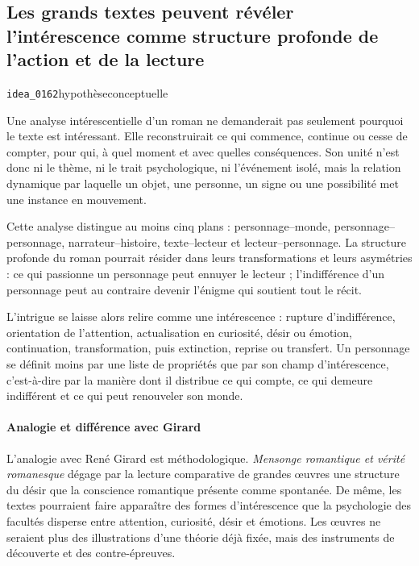\documentclass[10pt,a4paper]{article}
\begin{document}
\subsection{Les grands textes peuvent révéler l'intérescence comme structure profonde de l'action et de la lecture}
{\small\color{metadata} \texttt{idea\_0162}\quad\textbullet\quad hypothèse\quad\textbullet\quad conceptuelle\par}

Une analyse intérescentielle d'un roman ne demanderait pas seulement pourquoi le texte est intéressant. Elle reconstruirait ce qui commence, continue ou cesse de compter, pour qui, à quel moment et avec quelles conséquences. Son unité n'est donc ni le thème, ni le trait psychologique, ni l'événement isolé, mais la relation dynamique par laquelle un objet, une personne, un signe ou une possibilité met une instance en mouvement.

Cette analyse distingue au moins cinq plans : personnage–monde, personnage–personnage, narrateur–histoire, texte–lecteur et lecteur–personnage. La structure profonde du roman pourrait résider dans leurs transformations et leurs asymétries : ce qui passionne un personnage peut ennuyer le lecteur ; l'indifférence d'un personnage peut au contraire devenir l'énigme qui soutient tout le récit.

L'intrigue se laisse alors relire comme une intérescence : rupture d'indifférence, orientation de l'attention, actualisation en curiosité, désir ou émotion, continuation, transformation, puis extinction, reprise ou transfert. Un personnage se définit moins par une liste de propriétés que par son champ d'intérescence, c'est-à-dire par la manière dont il distribue ce qui compte, ce qui demeure indifférent et ce qui peut renouveler son monde.

\paragraph{Analogie et différence avec Girard}
L'analogie avec René Girard est méthodologique. \emph{Mensonge romantique et vérité romanesque} dégage par la lecture comparative de grandes œuvres une structure du désir que la conscience romantique présente comme spontanée. De même, les textes pourraient faire apparaître des formes d'intérescence que la psychologie des facultés disperse entre attention, curiosité, désir et émotions. Les œuvres ne seraient plus des illustrations d'une théorie déjà fixée, mais des instruments de découverte et des contre-épreuves.
\end{document}

